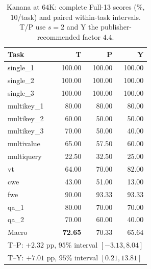 \begin{table}[ht]
\centering\small
\caption{Kanana at $64$K: complete Full-13 scores (\%, $10$/task) and paired within-task intervals. T/P use $s=2$ and Y the publisher-recommended factor $4.4$.}
\label{tab:kanana-tasks}
\begin{tabular}{@{}lrrr@{}}
\toprule
Task & T & P & Y \\
\midrule
single\_1 & 100.00 & 100.00 & 100.00 \\
single\_2 & 100.00 & 100.00 & 100.00 \\
single\_3 & 100.00 & 100.00 & 100.00 \\
multikey\_1 & 80.00 & 80.00 & 80.00 \\
multikey\_2 & 60.00 & 50.00 & 50.00 \\
multikey\_3 & 70.00 & 50.00 & 40.00 \\
multivalue & 65.00 & 57.50 & 60.00 \\
multiquery & 22.50 & 32.50 & 25.00 \\
vt & 64.00 & 70.00 & 82.00 \\
cwe & 43.00 & 51.00 & 13.00 \\
fwe & 90.00 & 93.33 & 93.33 \\
qa\_1 & 80.00 & 70.00 & 70.00 \\
qa\_2 & 70.00 & 60.00 & 40.00 \\
\midrule
Macro & \textbf{72.65} & 70.33 & 65.64 \\
\multicolumn{4}{l}{T--P: $+2.32$ pp, $95\%$ interval $[-3.13,8.04]$} \\
\multicolumn{4}{l}{T--Y: $+7.01$ pp, $95\%$ interval $[0.21,13.81]$} \\
\bottomrule
\end{tabular}
\end{table}

